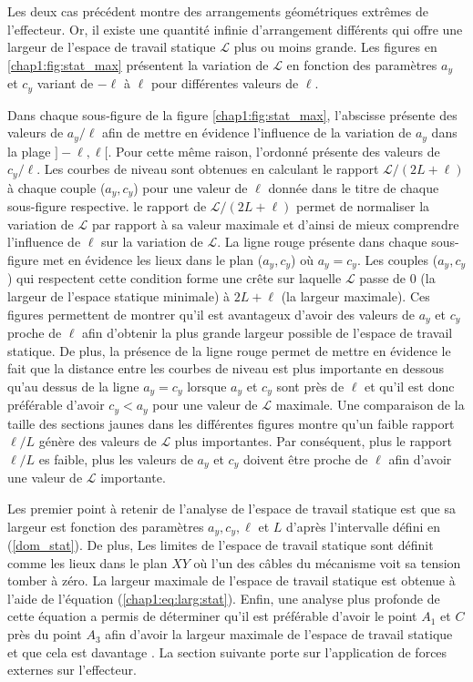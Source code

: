 Les deux cas précédent montre des arrangements géométriques extrêmes de l'effecteur. Or, il existe une quantité infinie d'arrangement différents qui offre une largeur de l'espace de travail statique $\mathcal{L}$ plus ou moins grande. Les figures en \ref{chap1:fig:stat_max} présentent la variation de $\mathcal{L}$ en fonction des paramètres $a_y$ et $c_y$ variant de $-\ell$ à $\ell$ pour différentes valeurs de $\ell$. \clearpage
 
\clearpage
Dans chaque sous-figure de la figure \ref{chap1:fig:stat_max}, l’abscisse présente des valeurs de $a_y/\ell$ afin de mettre en évidence l'influence de la variation de $a_y$ dans la plage $]-\ell,\ell[$. Pour cette même raison, l'ordonné présente des valeurs de $c_y/\ell$. Les courbes de niveau sont obtenues en calculant le rapport $\mathcal{L}/(2L+\ell)$ à chaque couple ($a_y,c_y$) pour une valeur de $\ell$ donnée dans le titre de chaque sous-figure respective. le rapport de $\mathcal{L}/(2L+\ell)$ permet de normaliser la variation de $\mathcal{L}$ par rapport à sa valeur maximale et d'ainsi de mieux comprendre l'influence de $\ell$ sur la variation de $\mathcal{L}$.  La ligne rouge présente dans chaque sous-figure met en évidence les lieux dans le plan ($a_y,c_y$) où $a_y=c_y$. Les couples ($a_y,c_y$) qui respectent cette condition forme une crête sur laquelle $\mathcal{L}$ passe de 0 (la largeur de l'espace statique minimale) à $2L+\ell$ (la largeur maximale). Ces figures permettent de montrer qu'il est avantageux d'avoir des valeurs de $a_y$ et $c_y$ proche de $\ell$ afin d'obtenir la plus grande largeur possible de l'espace de travail statique. De plus, la présence de la ligne rouge permet de mettre en évidence le fait que la distance entre les courbes de niveau est plus importante en dessous qu'au dessus de la ligne $a_y=c_y$ lorsque $a_y$ et $c_y$ sont près de $\ell$ et qu'il est donc préférable d'avoir $c_y<a_y$ pour une valeur de $\mathcal{L}$ maximale. Une comparaison de la taille des sections jaunes dans les différentes figures montre qu'un faible rapport $\ell/L$ génère des valeurs de $\mathcal{L}$ plus importantes. Par conséquent, plus le rapport $\ell/L$ es faible, plus les valeurs de $a_y$ et $c_y$ doivent être proche de $\ell$ afin d'avoir une valeur de $\mathcal{L}$ importante.\par
Les premier point à retenir de l'analyse de l'espace de travail statique est que sa largeur est fonction des paramètres $a_y, c_y, \ell$ et $L$ d'après l'intervalle défini en (\ref{dom_stat}). De plus, Les limites de l'espace de travail statique sont définit comme les lieux dans le plan $XY$ où l'un des câbles du mécanisme voit sa tension tomber à zéro. La  largeur maximale de l'espace de travail statique est obtenue à l'aide de l'équation (\ref{chap1:eq:larg:stat}). Enfin, une analyse plus profonde de cette équation a permis de déterminer qu'il est préférable d'avoir le point $A_1$ et $C$ près du point $A_3$ afin d'avoir la largeur maximale de l'espace de travail statique et que cela est davantage . La section suivante porte sur l'application de forces externes sur l'effecteur.

